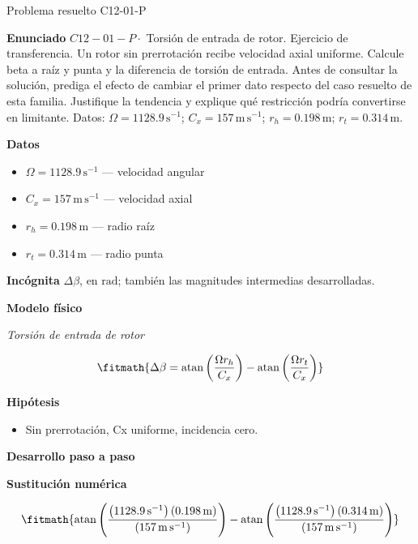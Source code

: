 \documentclass[10pt,openany]{book}
\begin{document}
\begin{studiumworked}{Problema resuelto C12-01-P}


\noindent\textbf{Enunciado}
\(C12-01-P \cdot\) Torsión de entrada de rotor. Ejercicio de transferencia. Un rotor sin prerrotación recibe velocidad axial uniforme. Calcule beta a raíz y punta y la diferencia de torsión de entrada. Antes de consultar la solución, prediga el efecto de cambiar el primer dato respecto del caso resuelto de esta familia. Justifique la tendencia y explique qué restricción podría convertirse en limitante. Datos: \(\Omega=1128.9\, \mathrm{s}^{-1}\); \(C_x=157\, \mathrm{m}\,\mathrm{s}^{-1}\); \(r_h=0.198\, \mathrm{m}\); \(r_t=0.314\, \mathrm{m}\).

\noindent\textbf{Datos}
\begin{itemize}
\item $\Omega = 1128.9\,\mathrm{s}^{-1}$ — velocidad angular
\item $C_x = 157\,\mathrm{m}\,\mathrm{s}^{-1}$ — velocidad axial
\item $r_h = 0.198\,\mathrm{m}$ — radio raíz
\item $r_t = 0.314\,\mathrm{m}$ — radio punta
\end{itemize}

\noindent\textbf{Incógnita}
$\Delta\beta$, en $\mathrm{rad}$; también las magnitudes intermedias desarrolladas.

\noindent\textbf{Modelo físico}

\noindent\textit{Torsión de entrada de rotor}

\[
\fitmath{\Delta\beta=\operatorname{atan}{\left(\frac{\Omega r_h}{C_x} \right)} - \operatorname{atan}{\left(\frac{\Omega r_t}{C_x} \right)}}
\]

\noindent\textbf{Hipótesis}
\begin{itemize}
\item Sin prerrotación, Cx uniforme, incidencia cero.
\end{itemize}

\noindent\textbf{Desarrollo paso a paso}



\noindent\textbf{Sustitución numérica}

\[
\fitmath{\operatorname{atan}{\left(\frac{\left(1128.9\,\mathrm{s}^{-1}\right) \left(0.198\,\mathrm{m}\right)}{\left(157\,\mathrm{m}\,\mathrm{s}^{-1}\right)} \right)} - \operatorname{atan}{\left(\frac{\left(1128.9\,\mathrm{s}^{-1}\right) \left(0.314\,\mathrm{m}\right)}{\left(157\,\mathrm{m}\,\mathrm{s}^{-1}\right)} \right)}}
\]


\end{studiumworked}
\end{document}
